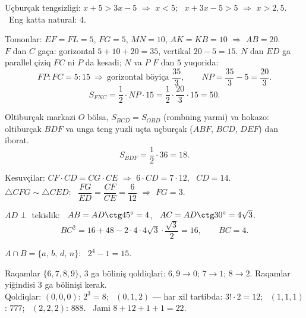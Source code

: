 Uçburçak tengsizligi: $x+5>3x-5$ $\Rightarrow$ $x<5$; \ $x+3x-5>5$ $\Rightarrow$ $x>2{,}5$. \ Eng katta natural: $4$.

Tomonlar: $EF=FL=5$, $FG=5$, $MN=10$, $AK=KB=10$ $\Rightarrow$ $AB=20$.\\
$F$ dan $C$ gaça: gorizontal $5+10+20=35$, vertikal $20-5=15$. $N$ dan $ED$ ga parallel çiziq $FC$ ni $P$ da kesadi; $N$ va $P$ $F$ dan $5$ yuqorida:
\[FP:FC=5:15\ \Rightarrow\ \text{gorizontal böyiça } \frac{35}3,\qquad NP=\frac{35}3-5=\frac{20}3.\]
\[S_{FNC}=\frac12\cdot NP\cdot15=\frac12\cdot\frac{20}3\cdot15=50.\]

Oltiburçak markazi $O$ bölsa, $S_{BCD}=S_{OBD}$ (rombning yarmi) va hokazo: oltiburçak $BDF$ va unga teng yuzli uçta uçburçak ($ABF$, $BCD$, $DEF$) dan iborat.
\[S_{BDF}=\frac12\cdot36=18.\]

Kesuvçilar: $CF\cdot CD=CG\cdot CE$ $\Rightarrow$ $6\cdot CD=7\cdot12$, \ $CD=14$.\\
$\triangle CFG\sim\triangle CED$: \ $\dfrac{FG}{ED}=\dfrac{CF}{CE}=\dfrac6{12}$ $\Rightarrow$ $FG=3$.

$AD\perp$ tekislik: \ $AB=AD\ctg45^\circ=4$, \ $AC=AD\ctg30^\circ=4\sqrt3$.
\[BC^2=16+48-2\cdot4\cdot4\sqrt3\cdot\frac{\sqrt3}2=16,\qquad BC=4.\]

$A\cap B=\{a,\,b,\,d,\,n\}$: \ $2^4-1=15$.

Raqamlar $\{6,7,8,9\}$, $3$ ga böliniş qoldiqlari: $6,9\to0$; $7\to1$; $8\to2$. Raqamlar yiğindisi $3$ ga bölinişi kerak.\\
Qoldiqlar: $(0,0,0)$: $2^3=8$; \ $(0,1,2)$ — har xil tartibda: $3!\cdot2=12$; \ $(1,1,1)$: $777$; \ $(2,2,2)$: $888$. \ Jami $8+12+1+1=22$.

